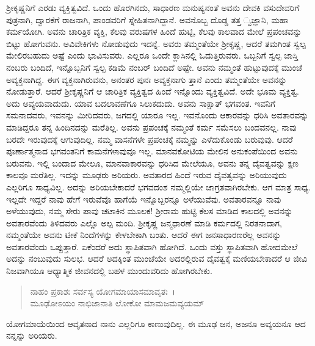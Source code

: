 ಶ‍್ರೀಕೃಷ್ಣನಿಗೆ ಎರಡು ವ್ಯಕ್ತಿತ್ವವಿದೆ. ಒಂದು ಹೊರಗಿನದು, ಸಾಧಾರಣ ಮನುಷ್ಯನಂತೆ ಅವನು ದೇವಕಿ ವಸುದೇವರಿಗೆ ಪುತ್ರನಾಗಿ, ದ್ವಾರಕೆಗೆ ರಾಜನಾಗಿ, ಪಾಂಡವರಿಗೆ ಸ್ನೇಹಿತನಾಗಿದ್ದಾನೆ. ಅವನೊಬ್ಬ ದೊಡ್ಡ ತತ್ತ ್ವಜ್ಞಾನಿ, ಮಹಾ ಕರ್ಮಯೋಗಿ. ಅವನು ಚಾರಿತ್ರಿಕ ವ್ಯಕ್ತಿ, ಕೆಲವು ವರುಷಗಳ ಹಿಂದೆ ಹುಟ್ಟಿ, ಕೆಲವು ಕಾಲವಾದ ಮೇಲೆ ಪ್ರಪಂಚವನ್ನು ಬಿಟ್ಟು ಹೋಗುವನು. ಅವಿವೇಕಿಗಳು ನೋಡುವುದು ಇದನ್ನೆ. ಅವರು ತಮ್ಮಂತೆಯೇ ಶ‍್ರೀಕೃಷ್ಣ, ಆದರೆ ತಮಗಿಂತ ಸ್ವಲ್ಪ ಮೇಲಿರಬಹುದು ಅಷ್ಟೆ ಎಂದು ಭಾವಿಸುವರು. ಎಲ್ಲರೂ ಒಂದೇ ಕ್ಲಾಸಿನಲ್ಲಿ ಓದುತ್ತಿರುವರು. ಒಬ್ಬನಿಗೆ ಸ್ವಲ್ಪ ಜಾಸ್ತಿ ನಂಬರು ಬಂದಿದೆ, ಇನ್ನೊಬ್ಬನಿಗೆ ಸ್ವಲ್ಪ ಕಡಿಮೆ ನಂಬರ್ ಬಂದಿದೆ ಅಷ್ಟೇ. ಅವನು ನಮ್ಮಂತೆ ಹುಟ್ಟುವುದಕ್ಕೆ ಮುಂಚೆ ಅವ್ಯಕ್ತನಾಗಿದ್ದ. ಈಗ ವ್ಯಕ್ತನಾಗಿರುವನು, ಅನಂತರ ಪುನಃ ಅವ್ಯಕ್ತನಾಗು ತ್ತಾನೆ ಎಂದು ತಮ್ಮಂತೆಯೇ ಅವನನ್ನು ನೋಡುತ್ತಾರೆ. ಆದರೆ ಶ‍್ರೀಕೃಷ್ಣನಿಗೆ ಆ ಚಾರಿತ್ರಿಕ ವ್ಯಕ್ತಿತ್ವದ ಹಿಂದೆ ಇನ್ನೊಂದು ವ್ಯಕ್ತಿತ್ವವಿದೆ. ಅದೇ ಭೂಮ ವ್ಯಕ್ತಿತ್ವ. ಅದು ಅವ್ಯಯವಾದುದು. ಯಾವ ಬದಲಾವಣೆಗೂ ಸಿಲುಕದುದು. ಅವನು ಸಾಕ್ಷಾತ್ ಭಗವಂತ. ಇವನಿಗೆ ಸಮನಾದವರು, ಇವನನ್ನು ಮೀರಿದವರು, ಜಗದಲ್ಲಿ ಯಾರೂ ಇಲ್ಲ. ಇವನೊಂದು ಆಕಾರವನ್ನು ಧರಿಸಿ ಅವತಾರವನ್ನು ಮಾಡಿದ್ದರೂ ತನ್ನ ಹಿಂದಿನದನ್ನು ಮರೆತಿಲ್ಲ. ಅವನು ಪ್ರಪಂಚಕ್ಕೆ ನಮ್ಮಂತೆ ಕರ್ಮ ಸಮೆಸಲು ಬಂದವನಲ್ಲ. ನಾವು ಬರದೇ ಇರುವುದಕ್ಕೆ ಆಗುವುದಿಲ್ಲ. ನಮ್ಮ ವಾಸನೆಗಳೇ ಪ್ರಪಂಚಕ್ಕೆ ನಮ್ಮನ್ನು ಎಳೆದುಕೊಂಡು ಬರುವುವು. ಆದರೆ ಪೂರ್ಣಾತ್ಮನಾದ ಭಗವಂತನಿಗೆ ಕಾಮನೆಗಳಾವುವೂ ಇಲ್ಲ. ಮಾನವಕೋಟಿಯ ಮೇಲಿನ ಅನುಕಂಪೆಯಿಂದ ಅವನು ಬರುವನು. ಇಲ್ಲಿ ಬಂದಾದ ಮೇಲೂ, ಮಾನವಾಕಾರವನ್ನು ಧರಿಸಿದ ಮೇಲೆಯೂ, ಅವನು ತನ್ನ ದೈವತ್ವವನ್ನು ಕ್ಷಣ ಕಾಲವೂ ಮರೆತಿಲ್ಲ. ಇದನ್ನು ಮೂಢರು ಅರಿಯರು. ಅವತಾರದ ಹಿಂದೆ ಇರುವ ದೈವತ್ವವನ್ನು ಅರಿಯುವುದು ಎಲ್ಲರಿಗೂ ಸಾಧ್ಯವಿಲ್ಲ. ಅದನ್ನು ಅರಿಯಬೇಕಾದರೆ ಭಗವದಂಶ ನಮ್ಮಲ್ಲಿಯೇ ಜಾಗ್ರತವಾಗಿರಬೇಕು. ಆಗ ಮಾತ್ರ ಸಾಧ್ಯ. ಇಲ್ಲದೇ ಇದ್ದರೆ ನಾವು ಹೇಗೆ ಇರುವೆವೊ ಹಾಗೆಯೆ ಇನ್ನೊಬ್ಬರನ್ನೂ ಅಳೆಯುವೆವು. ಅವತಾರವನ್ನೂ ನಾವು ಅಳೆಯುವುದು, ನಮ್ಮ ಸೇರು ಪಾವು ಚಟಾಕಿನ ಮೂಲಕ! ಶ‍್ರೀರಾಮ ಹುಟ್ಟಿ ಕೆಲಸ ಮಾಡಿದ ಕಾಲದಲ್ಲಿ ಅವನನ್ನು ಅವತಾರವೆಂದು ತಿಳಿದವರು ಎಲ್ಲೊ ಅಲ್ಪ ಮಂದಿ. ಶ‍್ರೀಕೃಷ್ಣ ಜನ್ಮಧಾರಣೆ ಮಾಡಿ ಕರ್ಮದಲ್ಲಿ ನಿರತನಾದಾಗ, ನಮ್ಮಂತೆಯೇ ಅವನು ಟೀಕೆ ನಿಂದೆಗಳನ್ನು ಕೇಳಬೇಕಾಗಿ ಬಂತು. ಆದರೆ ಈಗ ಜನಸಾಧಾರಣರೆಲ್ಲ ಅವನನ್ನು ಅವತಾರವೆಂದು ಒಪ್ಪುತ್ತಾರೆ. ಏಕೆಂದರೆ ಅದು ಸ್ಥಾಪಿತವಾಗಿ ಹೋಗಿದೆ. ಒಂದು ವಸ್ತು ಸ್ಥಾಪಿತವಾಗಿ ಹೋದಮೇಲೆ ಅದನ್ನು ನಂಬುವುದು ಸುಲಭ. ಆದರೆ ಅದಕ್ಕಿಂತ ಮುಂಚೆಯೇ ಅದರಲ್ಲಿರುವ ದೈವತ್ವಕ್ಕೆ ಮಣಿಯಬೇಕಾದರೆ ಆ ಜೀವಿ ನಿಜವಾಗಿಯೂ ಆಧ್ಯಾತ್ಮಿಕ ಜೀವನದಲ್ಲಿ ಬಹಳ ಮುಂದುವರಿದು ಹೋಗಿರಬೇಕು.

\begin{verse}
ನಾಹಂ ಪ್ರಕಾಶಃ ಸರ್ವಸ್ಯ ಯೋಗಮಾಯಾಸಮಾವೃತಃ~।\\ಮೂಢೋಽಯಂ ನಾಭಿಜಾನಾತಿ ಲೋಕೋ ಮಾಮಜಮವ್ಯಯಮ್ 
\end{verse}

{\small ಯೋಗಮಾಯೆಯಿಂದ ಆವೃತನಾದ ನಾನು ಎಲ್ಲರಿಗೂ ಕಾಣುವುದಿಲ್ಲ. ಈ ಮೂಢ ಜನ, ಅಜನೂ ಅವ್ಯಯನೂ ಆದ ನನ್ನನ್ನು ಅರಿಯರು.}

